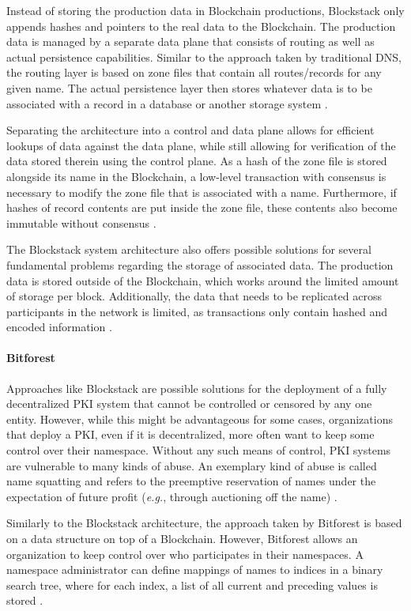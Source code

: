 Instead of storing the production data in Blockchain productions, Blockstack only appends hashes and pointers to the real data to the Blockchain. The production data is managed by a separate data plane that consists of routing as well as actual persistence capabilities. Similar to the approach taken by traditional DNS, the routing layer is based on zone files that contain all routes/records for any given name. The actual persistence layer then stores whatever data is to be associated with a record in a database or another storage system \cite{ali_blockstack:_2016}.

Separating the architecture into a control and data plane allows for efficient lookups of data against the data plane, while still allowing for verification of the data stored therein using the control plane. As a hash of the zone file is stored alongside its name in the Blockchain, a low-level transaction with consensus is necessary to modify the zone file that is associated with a name. Furthermore, if hashes of record contents are put inside the zone file, these contents also become immutable without consensus \cite{ali_blockstack:_2016}.

The Blockstack system architecture also offers possible solutions for several fundamental problems regarding the storage of associated data. The production data is stored outside of the Blockchain, which works around the limited amount of storage per block. Additionally, the data that needs to be replicated across participants in the network is limited, as transactions only contain hashed and encoded information \cite{ali_blockstack:_2016}.

\paragraph{Bitforest}

Approaches like Blockstack are possible solutions for the deployment of a fully decentralized PKI system that cannot be controlled or censored by any one entity. However, while this might be advantageous for some cases, organizations that deploy a PKI, even if it is decentralized, more often want to keep some control over their namespace. Without any such means of control, PKI systems are vulnerable to many kinds of abuse. An exemplary kind of abuse is called name squatting and refers to the preemptive reservation of names under the expectation of future profit (\textit{e.g.}, through auctioning off the name) \cite{dong_bitforest:_2018}.

Similarly to the Blockstack architecture, the approach taken by Bitforest is based on a data structure on top of a Blockchain. However, Bitforest allows an organization to keep control over who participates in their namespaces. A namespace administrator can define mappings of names to indices in a binary search tree, where for each index, a list of all current and preceding values is stored \cite{dong_bitforest:_2018}.

